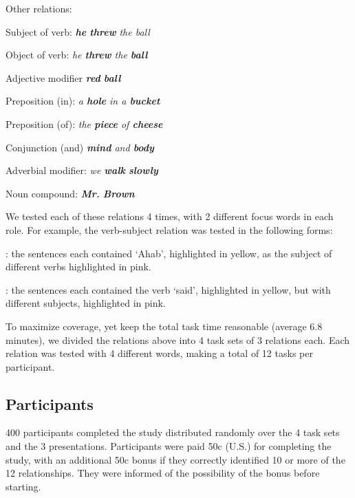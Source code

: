 Other relations:
\squishlist
	\item {} Subject of verb: \emph{\textbf{he} \textbf{threw} the ball}
	\item {} Object of verb:  \emph{ he \textbf{threw} the \textbf{ball}}
	\item {} Adjective modifier \emph{\textbf{red} \textbf{ball}}
	\item {}  Preposition (in): \emph{a \textbf{hole} in a \textbf{bucket}}
	\item {}	Preposition (of):  \emph{ the \textbf{piece} of \textbf{cheese}}
	\item {}  Conjunction (and)  \emph{ \textbf{mind} and \textbf{body}}
	\item{} Adverbial modifier: \emph{  we \textbf{walk} \textbf{slowly}}
	\item {} Noun compound:  \emph{ \textbf{Mr.}  \textbf{Brown}}
\squishend

We tested each of these relations 4 times, with 2 different focus words in each role. For example, the verb-subject relation  was tested in the following forms:
\squishlist
	\item {}:  the sentences each contained `Ahab', highlighted in yellow, as the subject of different verbs highlighted in pink.
	\item {}

	\item {}: the sentences each contained the verb `said', highlighted in yellow, but with different subjects, highlighted in pink.
	\item {}
\squishend

To maximize coverage, yet keep the total task time reasonable (average 6.8 minutes), we divided the relations above into 4 task sets of 3 relations each. Each relation was tested with 4 different words, making a total of 12 tasks per participant.

\subsection{Participants}
400 participants completed the study distributed randomly over the 4 task sets and the 3 presentations. Participants were paid 50c (U.S.) for completing the study, with an additional 50c bonus if they correctly identified 10 or more of the 12 relationships. They were informed of the possibility of the bonus before starting.

